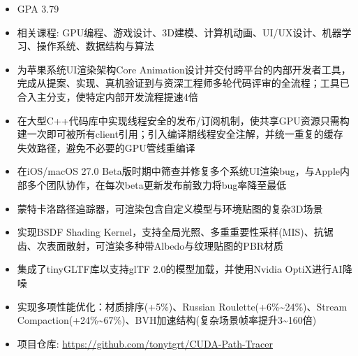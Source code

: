 



\begin{itemize}
  \item GPA 3.79
  \item 相关课程: GPU编程、游戏设计、3D建模、计算机动画、UI/UX设计、机器学习、操作系统、数据结构与算法
\end{itemize}

\begin{itemize}
  \item 为苹果系统UI渲染架构Core Animation设计并交付跨平台的内部开发者工具，完成从提案、实现、真机验证到与资深工程师多轮代码评审的全流程；工具已合入主分支，使特定内部开发流程提速4倍
  \item 在大型C++代码库中实现线程安全的发布/订阅机制，使共享GPU资源只需构建一次即可被所有client引用；引入编译期线程安全注解，并统一重复的缓存失效路径，避免不必要的GPU管线重编译
  \item 在iOS/macOS 27.0 Beta版时期中筛查并修复多个系统UI渲染bug，与Apple内部多个团队协作，在每次beta更新发布前致力将bug率降至最低
\end{itemize}

              
\begin{itemize}
  \item 蒙特卡洛路径追踪器，可渲染包含自定义模型与环境贴图的复杂3D场景
  \item 实现BSDF Shading Kernel，支持全局光照、多重重要性采样(MIS)、抗锯齿、次表面散射，可渲染多种带Albedo与纹理贴图的PBR材质
  \item 集成了tinyGLTF库以支持glTF 2.0的模型加载，并使用Nvidia OptiX进行AI降噪
  \item 实现多项性能优化：材质排序(+5\%)、Russian Roulette(+6\%\textasciitilde24\%)、Stream Compaction(+24\%\textasciitilde67\%)、BVH加速结构(复杂场景帧率提升3\textasciitilde160倍)
  \item 项目仓库: \url{https://github.com/tonytgrt/CUDA-Path-Tracer}
\end{itemize}

